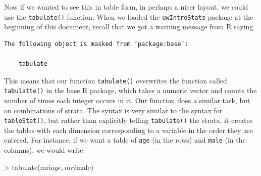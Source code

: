 \documentclass[landscape]{article}
\renewenvironment{Schunk}{\vspace{\topsep}}{\vspace{\topsep}}
\begin{document}
Now if we wanted to see this in table form, in perhaps a nicer layout, we could use the \texttt{tabulate()} function. When we loaded the \texttt{uwIntroStats} package at the beginning of this document, recall that we got a warning message from R saying
\begin{verbatim}
The following object is masked from ‘package:base’:

    tabulate
\end{verbatim}

This means that our function \texttt{tabulate()} overwrites the function called \texttt{tabulatte()} in the base R package, which takes a numeric vector and counts the number of times each integer occurs in it. Our function does a similar task, but on combinations of strata. The syntax is very similar to the syntax for \texttt{tableStat()}, but rather than explicitly telling \texttt{tabulate()} the strata, it creates the tables with each dimension corresponding to a variable in the order they are entered. For instance, if we want a table of \texttt{age} (in the rows) and \texttt{male} (in the columns), we would write
\begin{Schunk}
\begin{Sinput}
> tabulate(mri$age, mri$male)
\end{Sinput}
\end{Schunk}
\end{document}
